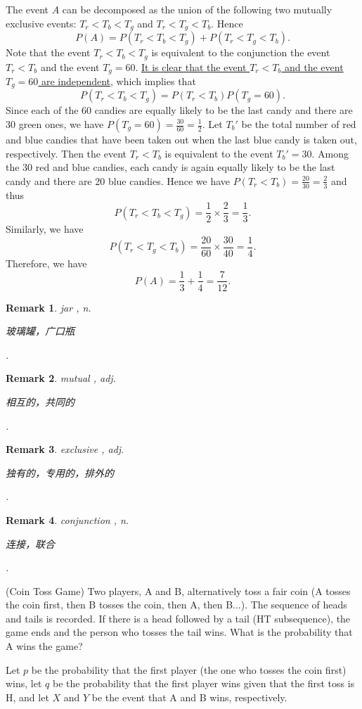 \documentclass[12pt,letterpaper, onecolumn]{exam}
\newtheorem{remark}{Remark}
\begin{document}
\begin{questions}
\begin{solution}
    \quad The event $A$ can be decomposed as the union of the following two mutually exclusive events: $T_r<T_b<T_g$ and $T_r<T_g<T_b$. Hence 
    $$P(A)=P(T_r<T_b<T_g)+P(T_r<T_g<T_b).$$
    \quad Note that the event $T_r<T_b<T_g$ is equivalent to the conjunction the event $T_r<T_b$ and the event $T_g=60$. \underline{It is clear that the event $T_r<T_b$ and the event}\\\underline{$T_g=60$ are independent}, which implies that 
    $$P(T_r<T_b<T_g)=P(T_r<T_b)P(T_g=60).$$
     Since each of the $60$ candies are equally likely to be the last candy and there are $30$ green ones, we have $P(T_g=60)=\frac{30}{60}=\frac{1}{2}$. Let $T_b'$ be the total number of red and blue candies that have been taken out when the last blue candy is taken out, respectively. Then the event $T_r<T_b$ is equivalent to the event $T_b'=30$. Among the $30$ red and blue candies, each candy is again equally likely to be the last candy and there are $20$ blue candies. Hence we have $P(T_r<T_b)=\frac{20}{30}=\frac{2}{3}$ and thus 
     $$P(T_r<T_b<T_g)=\frac{1}{2}\times\frac{2}{3}=\frac{1}{3}.$$
     Similarly, we have 
     $$P(T_r<T_g<T_b)=\frac{20}{60}\times\frac{30}{40}=\frac{1}{4}.$$
     Therefore, we have 
     $$P(A)=\frac{1}{3}+\frac{1}{4}=\frac{7}{12}.$$
\end{solution}
\begin{remark}
    jar , n. \begin{CJK}{UTF8}{gbsn}玻璃罐，广口瓶\end{CJK}.
\end{remark}
\begin{remark}
    mutual , adj. \begin{CJK}{UTF8}{gbsn}相互的，共同的\end{CJK}.
\end{remark}
\begin{remark}
    exclusive , adj. \begin{CJK}{UTF8}{gbsn}独有的，专用的，排外的\end{CJK}.
\end{remark}
\begin{remark}
    conjunction , n. \begin{CJK}{UTF8}{gbsn}连接，联合\end{CJK}.
\end{remark}

\question[](Coin Toss Game) Two players, A and B, alternatively toss a fair coin (A tosses the coin first, then B tosses the coin, then A, then B...). The sequence of heads and tails is recorded. If there is a head followed by a tail (HT subsequence), the game ends and the person who tosses the tail wins. What is the probability that A wins the game?
\begin{solution}
    Let $p$ be the probability that the first player (the one who tosses the coin first) wins, let $q$ be the probability that the first player wins given that the first toss is H, and let $X$ and $Y$ be the event that A and B wins, respectively.


\end{solution}
\end{questions}
\end{document}

